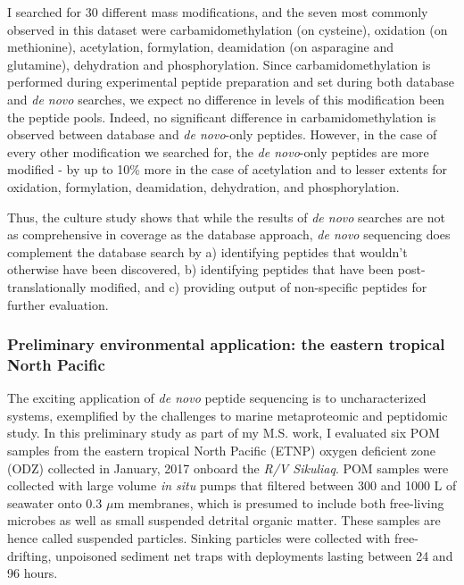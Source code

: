 \documentclass[12pt, letterpaper, twoside]{article}
\begin{document}
I searched for 30 different mass modifications, and the seven most commonly observed in this dataset were carbamidomethylation (on cysteine), oxidation (on methionine), acetylation, formylation, deamidation (on asparagine and glutamine), dehydration and phosphorylation. Since carbamidomethylation is performed during experimental peptide preparation and set during both database and \textit{de novo} searches, we expect no difference in levels of this modification been the peptide pools. Indeed, no significant difference in carbamidomethylation is observed between database and \textit{de novo}-only peptides. However, in the case of every other modification we searched for, the \textit{de novo}-only peptides are more modified - by up to 10\% more in the case of acetylation and to lesser extents for oxidation, formylation, deamidation, dehydration, and phosphorylation. 

Thus, the culture study shows that while the results of \textit{de novo} searches are not as comprehensive in coverage as the database approach, \textit{de novo} sequencing does complement the database search by a) identifying peptides that wouldn’t otherwise have been discovered, b) identifying peptides that have been post-translationally modified, and c) providing output of non-specific peptides for further evaluation. 

\subsubsection{Preliminary environmental application: the eastern tropical North Pacific}

The exciting application of \textit{de novo} peptide sequencing is to uncharacterized systems, exemplified by the challenges to marine metaproteomic and peptidomic study. In this preliminary study as part of my M.S. work, I evaluated six POM samples from the eastern tropical North Pacific (ETNP) oxygen deficient zone (ODZ) collected in January, 2017 onboard the \textit{R/V Sikuliaq}. POM samples were collected with large volume \textit{in situ} pumps that filtered between 300 and 1000 L of seawater onto 0.3 $\mu$m membranes, which is presumed to include both free-living microbes as well as small suspended detrital organic matter. These samples are hence called suspended particles. Sinking particles were collected with free-drifting, unpoisoned sediment net traps with deployments lasting between 24 and 96 hours. 
\end{document}
